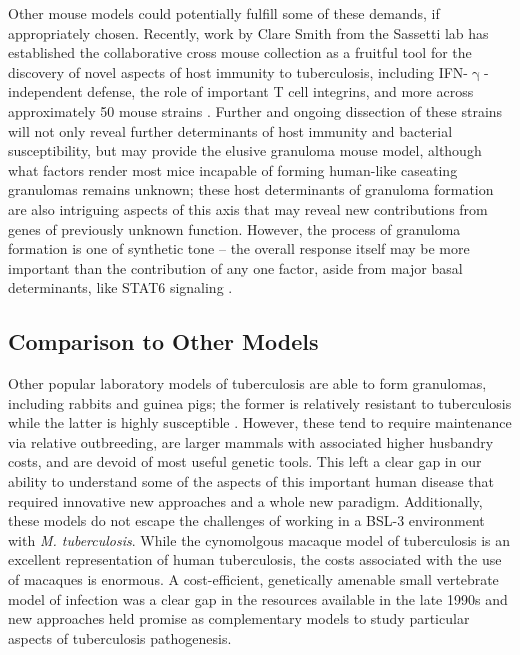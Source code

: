 Other mouse models could potentially fulfill some of these demands, if appropriately chosen. Recently, work by Clare Smith from the Sassetti lab has established the collaborative cross mouse collection as a fruitful tool for the discovery of novel aspects of host immunity to tuberculosis, including IFN-$\upgamma$-independent defense, the role of important T cell integrins, and more across approximately 50 mouse strains \citep{Smith2016, Smith2022}. Further and ongoing dissection of these strains will not only reveal further determinants of host immunity and bacterial susceptibility, but may provide the elusive granuloma mouse model, although what factors render most mice incapable of forming human-like caseating granulomas remains unknown; these host determinants of granuloma formation are also intriguing aspects of this axis that may reveal new contributions from genes of previously unknown function. However, the process of granuloma formation is one of synthetic tone -- the overall response itself may be more important than the contribution of any one factor, aside from major basal determinants, like STAT6 signaling \citep{Cronan2021}.

\subsection{Comparison to Other Models}

Other popular laboratory models of tuberculosis are able to form granulomas, including rabbits and guinea pigs; the former is relatively resistant to tuberculosis while the latter is highly susceptible \citep{Clark2014, Dorman2004, Heppleston1949}. However, these tend to require maintenance via relative outbreeding, are larger mammals with associated higher husbandry costs, and are devoid of most useful genetic tools. This left a clear gap in our ability to understand some of the aspects of this important human disease that required innovative new approaches and a whole new paradigm. Additionally, these models do not escape the challenges of working in a BSL-3 environment with \textit{M. tuberculosis}. While the cynomolgous macaque model of tuberculosis is an excellent representation of human tuberculosis, the costs associated with the use of macaques is enormous. A cost-efficient, genetically amenable small vertebrate model of infection was a clear gap in the resources available in the late 1990s and new approaches held promise as complementary models to study particular aspects of tuberculosis pathogenesis.

